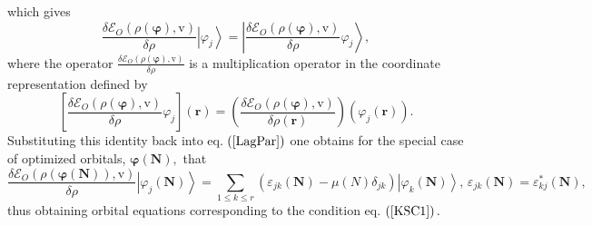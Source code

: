 \documentclass[aps,preprint]{revtex4}%
\begin{document}
which gives
\begin{equation}
\frac{\delta\mathcal{E}_{O}\left(  \rho\left(  \boldsymbol{\varphi}\right)
\boldsymbol{,}\mathrm{v}\right)  }{\delta\rho}\left\vert \varphi
_{j}\right\rangle =\left\vert \frac{\delta\mathcal{E}_{O}\left(  \rho\left(
\boldsymbol{\varphi}\right)  \boldsymbol{,}\mathrm{v}\right)  }{\delta\rho
}\varphi_{j}\right\rangle ,
\end{equation}
where the operator $\frac{\delta\mathcal{E}_{O}\left(  \rho\left(
\boldsymbol{\varphi}\right)  \boldsymbol{,}\mathrm{v}\right)  }{\delta\rho}$
is a multiplication operator in the coordinate representation defined by
\begin{equation}
\left[  \frac{\delta\mathcal{E}_{O}\left(  \rho\left(  \boldsymbol{\varphi
}\right)  \boldsymbol{,}\mathrm{v}\right)  }{\delta\rho}\varphi_{j}\right]
\left(  \boldsymbol{r}\right)  =\left(  \frac{\delta\mathcal{E}_{O}\left(
\rho\left(  \boldsymbol{\varphi}\right)  \boldsymbol{,}\mathrm{v}\right)
}{\delta\rho\left(  \boldsymbol{r}\right)  }\right)  \left(  \varphi
_{j}\left(  \boldsymbol{r}\right)  \right)  .
\end{equation}
Substituting this identity back into eq. $\left(  \ref{LagPar}\right)  $ one
obtains for the special case of optimized orbitals, $\boldsymbol{\varphi
\left(  \boldsymbol{N}\right)  },$ that%
\begin{equation}
\frac{\delta\mathcal{E}_{O}\left(  \rho\left(  \boldsymbol{\varphi\left(
\boldsymbol{N}\right)  }\right)  ,\mathrm{v}\right)  }{\delta\rho}\left\vert
\varphi_{j}\left(  \boldsymbol{N}\right)  \right\rangle =\sum_{1\leq k\leq
r}\left(  \varepsilon_{jk}\left(  \boldsymbol{N}\right)  -\mu\left(  N\right)
\delta_{jk}\right)  \left\vert \varphi_{k}\left(  \boldsymbol{N}\right)
\right\rangle ,\,\varepsilon_{jk}\left(  \boldsymbol{N}\right)  =\varepsilon
_{kj}^{\ast}\left(  \boldsymbol{N}\right)  , \label{FockEq}%
\end{equation}
thus obtaining orbital equations corresponding to the condition eq. $\left(
\ref{KSC1}\right)  .$
\end{document}

